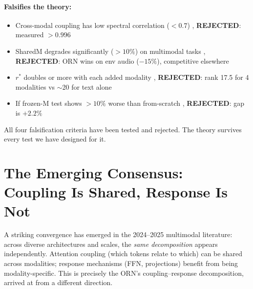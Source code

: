 \documentclass[11pt, a4paper]{article}
\theoremstyle{plain}
\theoremstyle{remark}
\begin{document}
\paragraph{Falsifies the theory:}
\begin{itemize}[nosep]
    \item Cross-modal coupling has low spectral correlation ($< 0.7$) ,  \textbf{REJECTED}: measured $> 0.996$ \checkmark
    \item SharedM degrades significantly ($> 10\%$) on multimodal tasks ,  \textbf{REJECTED}: ORN wins on env audio ($-15\%$), competitive elsewhere \checkmark
    \item $r^*$ doubles or more with each added modality ,  \textbf{REJECTED}: rank 17.5 for 4 modalities vs $\sim$20 for text alone \checkmark
    \item If frozen-M test shows $> 10\%$ worse than from-scratch ,  \textbf{REJECTED}: gap is $+2.2\%$ \checkmark
\end{itemize}

All four falsification criteria have been tested and rejected.
The theory survives every test we have designed for it.


\section{The Emerging Consensus: Coupling Is Shared, Response Is Not}
\label{sec:consensus}

A striking convergence has emerged in the 2024--2025 multimodal literature: across diverse architectures and scales, the \emph{same decomposition} appears independently.
Attention coupling (which tokens relate to which) can be shared across modalities; response mechanisms (FFN, projections) benefit from being modality-specific.
This is precisely the ORN's coupling--response decomposition, arrived at from a different direction.
\end{document}
